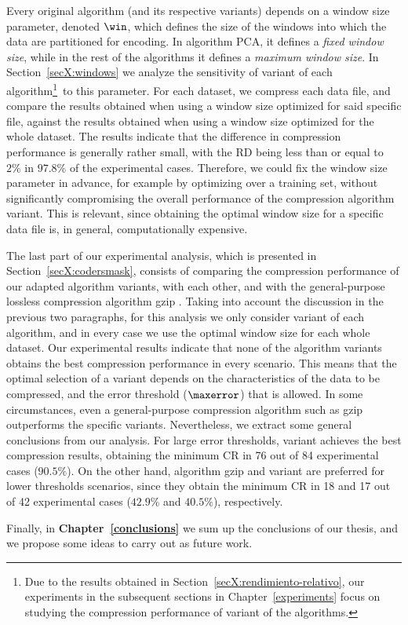 \newcommand{\footSupportFocus}{\footnote{\label{note1}Due to the results obtained in Section~\ref{secX:rendimiento-relativo}, our experiments in the subsequent sections in Chapter~\ref{experiments} focus on studying the compression performance of variant \maskalgo of the algorithms.}}


Every original algorithm (and its respective variants) depends on a window size parameter, denoted $\win$, which defines the size of the windows into which the data are partitioned for encoding. In algorithm PCA, it defines a \textit{fixed window size}, while in the rest of the algorithms it defines a \textit{maximum window size}. In Section~\ref{secX:windows} we analyze the sensitivity of variant \maskalgo of each algorithm\footSupportFocus\ to this parameter. For each dataset, we compress each data file, and compare the results obtained when using a window size optimized for said specific file, against the results obtained when using a window size optimized for the whole dataset. The results indicate that the difference in compression performance is generally rather small, with the RD being less than or equal to $2\%$ in $97.8\%$ of the experimental cases. Therefore, we could fix the window size parameter in advance, for example by optimizing over a training set, without significantly compromising the overall performance of the compression algorithm variant. This is relevant, since obtaining the optimal window size for a specific data file is, in general, computationally expensive.


The last part of our experimental analysis, which is presented in Section~\ref{secX:codersmask}, consists of comparing the compression performance of our adapted algorithm variants, with each other, and with the general-purpose lossless compression algorithm gzip \cite{gzip}. Taking into account the discussion in the previous two paragraphs, for this analysis we only consider variant \maskalgo of each algorithm, and in every case we use the optimal window size for each whole dataset. Our experimental results indicate that none of the algorithm variants obtains the best compression performance in every scenario. This means that the optimal selection of a variant depends on the characteristics of the data to be compressed, and the error threshold ($\maxerror$) that is allowed. In some circumstances, even a general-purpose compression algorithm such as gzip outperforms the specific variants. Nevertheless, we extract some general conclusions from our analysis. For large error thresholds, variant  achieves the best compression results, obtaining the minimum CR in 76 out of 84 experimental cases ($90.5\%$). On the other hand, algorithm gzip and variant  are preferred for lower thresholds scenarios, since they obtain the minimum CR in 18 and 17 out of 42 experimental cases ($42.9\%$ and $40.5\%$), respectively.


Finally, in \textbf{Chapter~\ref{conclusions}} we sum up the conclusions of our thesis, and we propose some ideas to carry out as future work.

